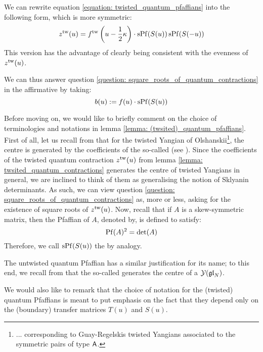             \begin{remark}
                We can rewrite equation \eqref{equation: twisted_quantum_pfaffians} into the following form, which is more symmetric:
                    \begin{equation} \label{equation: }
                        z^{\mathrm{tw}}(u) = f^{\mathrm{tw}}\left( u - \frac12 \kappa \right) \cdot \operatorname{sPf}(  S(u) ) \operatorname{sPf}( S(-u) )
                    \end{equation}
                This version has the advantage of clearly being consistent with the evenness of $z^{\mathrm{tw}}(u)$.

                We can thus answer question \ref{question: square_roots_of_quantum_contractions} in the affirmative by taking:
                $$b(u) := f(u) \cdot \operatorname{sPf}( S(u) )$$
            \end{remark}
            \begin{remark}
                Before moving on, we would like to briefly comment on the choice of terminologies and notations in lemma \ref{lemma: (twsited)_quantum_pfaffians}. First of all, let us recall from \cite[Section 2.5]{molev_yangians_and_classical_lie_algebras} that for the twisted Yangian of Olshanskii\footnote{... corresponding to Guay-Regelskis twisted Yangians associated to the symmetric pairs of type $\mathsf{A}$.}, the centre is generated by the coefficients of the so-called  (see \cite[Definition 2.5.2]{molev_yangians_and_classical_lie_algebras}). Since the coefficients of the twisted quantum contraction $z^{\mathrm{tw}}(u)$ from lemma \ref{lemma: twsited_quantum_contractions} generates the centre of twisted Yangians in general, we are inclined to think of them as generalising the notion of Sklyanin determinants. As such, we can view question \ref{question: square_roots_of_quantum_contractions} as, more or less, asking for the existence of square roots of $z^{\mathrm{tw}}(u)$. Now, recall that if $A$ is a skew-symmetric matrix, then the Pfaffian of $A$, denoted by, is defined to satisfy:
                    $$\operatorname{Pf}(A)^2 = \det(A)$$
                Therefore, we call $\operatorname{sPf}( S(u) )$ the  by analogy.

                The untwisted quantum Pfaffian has a similar justification for its name; to this end, we recall from \cite[Section 1.6]{molev_yangians_and_classical_lie_algebras} that the so-called  generates the centre of a $\mathcal{Y}(\mathfrak{gl}_N)$.

                We would also like to remark that the choice of notation for the (twisted) quantum Pfaffians is meant to put emphasis on the fact that they depend only on the (boundary) transfer matrices $T(u)$ and $S(u)$.
            \end{remark}
                
